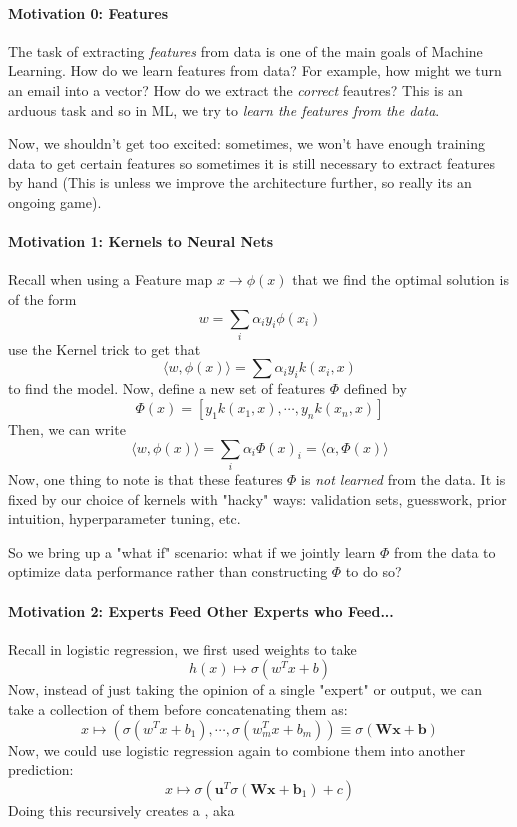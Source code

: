 \documentclass[11pt]{scrartcl}
\begin{document}
\paragraph{Motivation 0: Features}
The task of extracting \textit{features} from data is one of the main goals of Machine Learning. How do we learn features from data? For example, how might we turn an email into a vector? How do we extract the \textit{correct} feautres? This is an arduous task and so in ML, we try to \textit{learn the features from the data}.

Now, we shouldn't get too excited: sometimes, we won't have enough training data to get certain features so sometimes it is still necessary to extract features by hand (This is unless we improve the architecture further, so really its an ongoing game).
\paragraph{Motivation 1: Kernels to Neural Nets}
Recall when using a Feature map $x \to \phi(x)$ that we find the optimal solution is of the form $$w=\sum_i{\alpha_i y_i \phi(x_i)}$$ use the Kernel trick to get that $$\langle w, \phi(x) \rangle = \sum{\alpha_i y_i k(x_i,x)}$$ 
to find the model. Now, define a new set of features $\Phi$ defined by $$\Phi(x)=[y_1k(x_1,x),\cdots,y_nk(x_n,x)]$$
Then, we can write $$\langle w, \phi(x) \rangle = \sum_{i}\alpha_i\Phi(x)_i = \langle \alpha, \Phi(x) \rangle$$
Now, one thing to note is that these features $\Phi$ is \textit{not learned} from the data. It is fixed by our choice of kernels with "hacky" ways: validation sets, guesswork, prior intuition, hyperparameter tuning, etc.

So we bring up a "what if" scenario: what if we jointly learn $\Phi$ from the data to optimize data performance rather than constructing $\Phi$ to do so?

\paragraph{Motivation 2: Experts Feed Other Experts who Feed...}
Recall in logistic regression, we first used weights to take $$h(x) \mapsto \sigma(w^{T}x+b)$$
Now, instead of just taking the opinion of a single "expert" or output, we can take a collection of them before concatenating them as: $$x \mapsto (\sigma(w^{T}x+b_1),\cdots,\sigma(w_m^{T}x+b_m)) \equiv \sigma(\textbf{W}\textbf{x}+\textbf{b})$$
Now, we could use logistic regression again to combione them into another prediction: 
$$x \mapsto \sigma(\textbf{u}^{T}\sigma(\textbf{W}\textbf{x}+\textbf{b}_1)+c)$$
Doing this recursively creates a , aka  
\end{document}
